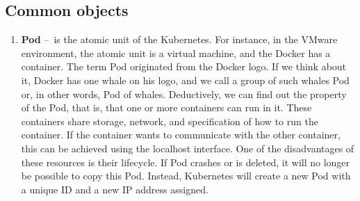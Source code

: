 \subsection{Common objects}
\label{objects}

\begin{enumerate}[itemsep=1mm, parsep=0pt]
    \item \textbf{Pod} \---\ is the atomic unit of the Kubernetes. For instance, in the VMware environment, the atomic unit is a virtual machine, and the Docker has a container. The term Pod originated from the Docker logo. If we think about it, Docker has one whale on his logo, and we call a group of such whales Pod or, in other words, Pod of whales. Deductively, we can find out the property of the Pod, that is, that one or more containers can run in it. These containers share storage, network, and specification of how to run the container. If the container wants to communicate with the other container, this can be achieved using the localhost interface. One of the disadvantages of these resources is their lifecycle. If Pod crashes or is deleted, it will no longer be possible to copy this Pod. Instead, Kubernetes will create a new Pod with a unique ID and a new IP address assigned.
    

\end{enumerate}
